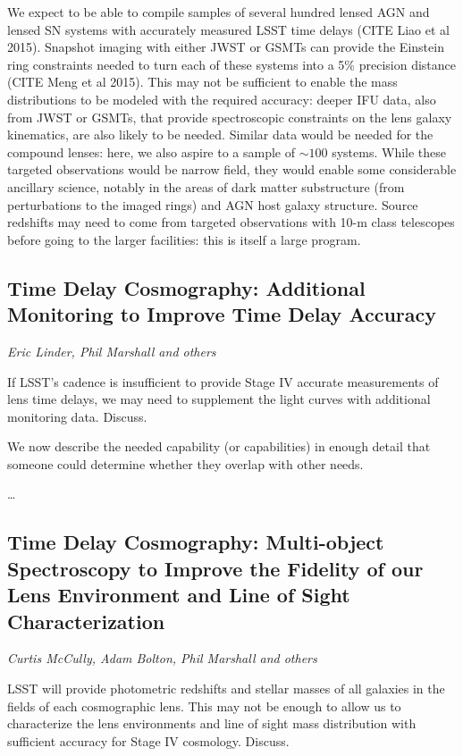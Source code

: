 We expect to be able to compile samples of several hundred lensed AGN
and  lensed SN systems with accurately measured LSST time delays (CITE
Liao et al 2015). Snapshot imaging with either JWST or GSMTs can provide
the Einstein ring constraints needed to turn each of these systems into
a  5\% precision distance (CITE Meng et al 2015). This may not be
sufficient to enable the mass distributions to be modeled with the
required accuracy: deeper IFU data, also from JWST or GSMTs, that
provide spectroscopic constraints on the lens galaxy kinematics, are
also likely to be needed.  Similar data would be needed for the compound
lenses: here, we also  aspire to a sample of $\sim 100$ systems. While
these targeted observations would be narrow field, they would enable
some considerable ancillary science, notably  in the areas of dark
matter substructure (from perturbations to the imaged rings) and AGN
host galaxy structure. Source redshifts may  need to come from targeted
observations with 10-m class telescopes  before going to the larger
facilities: this is itself a large program.



\subsection{Time Delay Cosmography: Additional Monitoring to Improve Time Delay Accuracy}
{\it Eric Linder, Phil Marshall and others}

If LSST's cadence is insufficient to provide Stage IV accurate
measurements of lens time delays, we may need to supplement the light
curves with additional monitoring data. Discuss.

We now describe the needed capability (or capabilities) in enough detail
that someone could determine whether they overlap with other needs.

\ldots


\subsection{Time Delay Cosmography: Multi-object Spectroscopy to Improve the Fidelity of our Lens Environment and Line of Sight Characterization}
{\it Curtis McCully, Adam Bolton, Phil Marshall and others}

LSST will provide photometric redshifts and stellar masses of all
galaxies in the fields of each cosmographic lens. This may not be enough
to allow us to characterize the lens environments and line of sight mass
distribution with sufficient accuracy for Stage IV cosmology. Discuss.


